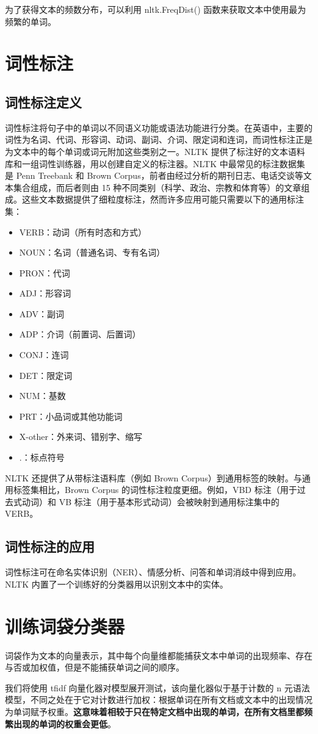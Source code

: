 为了获得文本的频数分布，可以利用 nltk.FreqDist() 函数来获取文本中使用最为频繁的单词。
\section{词性标注}
\subsection{词性标注定义}
词性标注将句子中的单词以不同语义功能或语法功能进行分类。在英语中，主要的词性为名词、代词、形容词、动词、副词、介词、限定词和连词，而词性标注正是为文本中的每个单词或词元附加这些类别之一。NLTK 提供了标注好的文本语料库和一组词性训练器，用以创建自定义的标注器。NLTK 中最常见的标注数据集是 Penn Treebank 和 Brown Corpus，前者由经过分析的期刊日志、电话交谈等文本集合组成，而后者则由 15 种不同类别（科学、政治、宗教和体育等）的文章组成。这些文本数据提供了细粒度标注，然而许多应用可能只需要以下的通用标注集：
\begin{itemize}
    \item VERB：动词（所有时态和方式）
    \item NOUN：名词（普通名词、专有名词）
    \item PRON：代词
    \item ADJ：形容词
    \item ADV：副词
    \item ADP：介词（前置词、后置词）
    \item CONJ：连词
    \item DET：限定词
    \item NUM：基数
    \item PRT：小品词或其他功能词
    \item X-other：外来词、错别字、缩写
    \item .：标点符号
\end{itemize}
NLTK 还提供了从带标注语料库（例如 Brown Corpus）到通用标签的映射。与通用标签集相比，Brown Corpus 的词性标注粒度更细。例如，VBD 标注（用于过去式动词）和 VB 标注（用于基本形式动词）会被映射到通用标注集中的 VERB。
\subsection{词性标注的应用}
词性标注可在命名实体识别（NER）、情感分析、问答和单词消歧中得到应用。NLTK 内置了一个训练好的分类器用以识别文本中的实体。
\section{训练词袋分类器}
词袋作为文本的向量表示，其中每个向量维都能捕获文本中单词的出现频率、存在与否或加权值，但是不能捕获单词之间的顺序。

我们将使用 tfidf 向量化器对模型展开测试，该向量化器似于基于计数的 n 元语法模型，不同之处在于它对计数进行加权：根据单词在所有文档或文本中的出现情况为单词赋予权重。\textbf{这意味着相较于只在特定文档中出现的单词，在所有文档里都频繁出现的单词的权重会更低}。